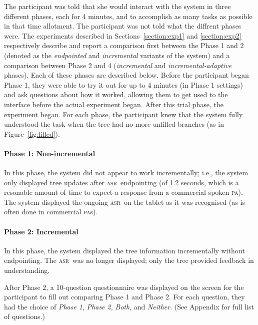 \documentclass[11pt]{article}
\newcommand{\asr}[0]{\textsc{asr}}
\newcommand{\pa}[0]{\textsc{pa}}
\begin{document}
The participant was told that she would interact with the system in three different phases, each for 4 minutes, and to accomplish as many tasks as possible in that time allotment. The participant was not told what the diffrent phases were. The experiments described in Sections~\ref{section:exp1} and \ref{section:exp2} respectively describe and report a comparison first between the Phase 1 and 2 (denoted as the \emph{endpointed} and \emph{incremental} variants of the system) and a comparison between Phase 2 and 4 (\emph{incremental} and \emph{incremental-adaptive} phases). Each of these phases are described below. Before the participant began Phase 1, they were able to try it out for up to 4 minutes (in Phase 1 settings) and ask questions about how it worked, allowing them to get used to the interface before the actual experiment began. After this trial phase, the experiment began. For each phase, the participant knew that the system fully understood the task when the tree had no more unfilled branches (as in Figure~\ref{fig:filled}). 

\paragraph{Phase 1: Non-incremental} In this phase, the system did not appear to work incrementally; i.e., the system only displayed tree updates after \asr\ endpointing (of 1.2 seconds, which is a resonable amount of time to expect a response from a commercial spoken \pa). The system displayed the ongoing \asr\ on the tablet as it was recognised (as is often done in commercial \pa s). 

\paragraph{Phase 2: Incremental} In this phase, the system displayed the tree information incrementally without endpointing. The \asr\ was no longer displayed; only the tree provided feedback in understanding. 

After Phase 2, a 10-question questionnaire was displayed on the screen for the participant to fill out comparing Phase 1 and Phase 2. For each question, they had the choice of \emph{Phase 1}, \emph{Phase 2}, \emph{Both}, and \emph{Neither}. (See Appendix for full list of questions.) 
\end{document}
